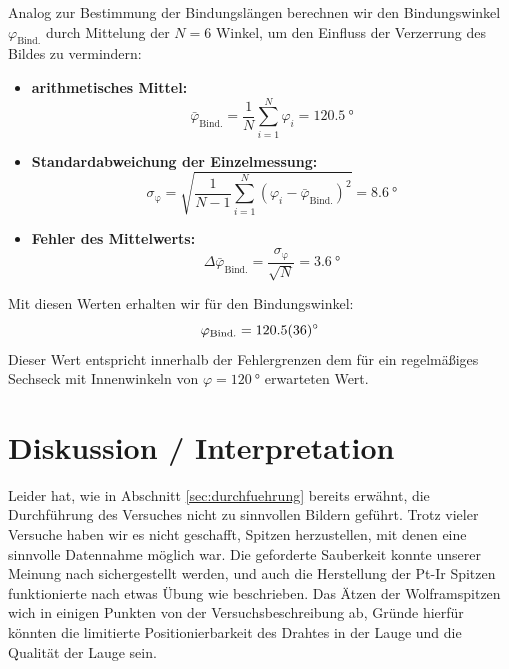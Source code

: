 \documentclass[10pt, a4paper]{article}
\begin{document}


Analog zur Bestimmung der Bindungslängen berechnen wir den Bindungswinkel $\varphi_\mathrm{Bind.}$ durch Mittelung der $N = 6$ Winkel, um den Einfluss der Verzerrung des Bildes zu vermindern:
\begin{itemize}
  \item \textbf{arithmetisches Mittel:}
  \begin{equation}
    \bar{\varphi}_\mathrm{Bind.} = \frac{1}{N} \sum_{i=1}^N \varphi_i = \SI{120,5}{\degree}
  \end{equation}
  
  \item \textbf{Standardabweichung der Einzelmessung:}
  \begin{equation}
    \sigma_\mathrm{\varphi} = \sqrt{\frac{1}{N-1} \sum_{i=1}^N (\varphi_i - \bar{\varphi}_\mathrm{Bind.})^2} = \SI{8,6}{\degree}
  \end{equation}
  
  \item \textbf{Fehler des Mittelwerts:}
  \begin{equation}
    \Delta \bar{\varphi}_\mathrm{Bind.} = \frac{\sigma_\mathrm{\varphi}}{\sqrt{N}} = \SI{3,6}{\degree}
  \end{equation}
\end{itemize}
Mit diesen Werten erhalten wir für den Bindungswinkel:
\begin{equation*}
  \varphi_\mathrm{Bind.} = \SI{120,5 +- 3,6}{\degree}
\end{equation*}
Dieser Wert entspricht innerhalb der Fehlergrenzen dem für ein regelmäßiges Sechseck mit Innenwinkeln von $\varphi = \SI{120}{\degree}$ erwarteten Wert.


\section{Diskussion / Interpretation}
\label{sec:Diskussion}

Leider hat, wie in Abschnitt \ref{sec:durchfuehrung} bereits erwähnt, die Durchführung des Versuches nicht zu sinnvollen Bildern geführt.
Trotz vieler Versuche haben wir es nicht geschafft, Spitzen herzustellen, mit denen eine sinnvolle Datennahme möglich war.
Die geforderte Sauberkeit konnte unserer Meinung nach sichergestellt werden, und auch die Herstellung der Pt-Ir Spitzen funktionierte nach etwas Übung wie beschrieben.
Das Ätzen der Wolframspitzen wich in einigen Punkten von der Versuchsbeschreibung ab, Gründe hierfür könnten die limitierte Positionierbarkeit des Drahtes in der Lauge und die Qualität der Lauge sein.
\end{document}
